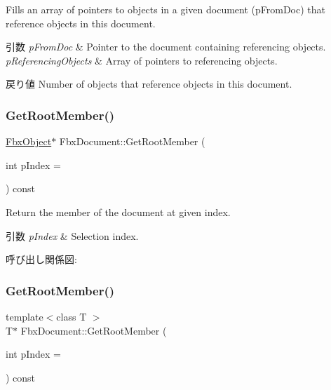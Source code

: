 Fills an array of pointers to objects in a given document (p\+From\+Doc) that reference objects in this document.


\begin{DoxyParams}{引数}
{\em p\+From\+Doc} & Pointer to the document containing referencing objects. \\
\hline
{\em p\+Referencing\+Objects} & Array of pointers to referencing objects. \\
\hline
\end{DoxyParams}
\begin{DoxyReturn}{戻り値}
Number of objects that reference objects in this document. 
\end{DoxyReturn}
\mbox{\label{class_fbx_document_a8616a424167ea7fe62239afbacb2afa0}} 
\subsubsection{\texorpdfstring{Get\+Root\+Member()}{GetRootMember()}\hspace{0.1cm}{\footnotesize\ttfamily [1/3]}}
{\footnotesize\ttfamily \hyperlink{class_fbx_object}{Fbx\+Object}$\ast$ Fbx\+Document\+::\+Get\+Root\+Member (\begin{DoxyParamCaption}\item[{int}]{p\+Index = {} }\end{DoxyParamCaption}) const}

Return the member of the document at given index. 
\begin{DoxyParams}{引数}
{\em p\+Index} & Selection index. \\
\hline
\end{DoxyParams}
呼び出し関係図\+:
\mbox{\label{class_fbx_document_a47286996a0ae5e3e86d561e155f5f37b}} 
\subsubsection{\texorpdfstring{Get\+Root\+Member()}{GetRootMember()}\hspace{0.1cm}{\footnotesize\ttfamily [2/3]}}
{\footnotesize\ttfamily template$<$class T $>$ \\
T$\ast$ Fbx\+Document\+::\+Get\+Root\+Member (\begin{DoxyParamCaption}\item[{int}]{p\+Index = {} }\end{DoxyParamCaption}) const}

